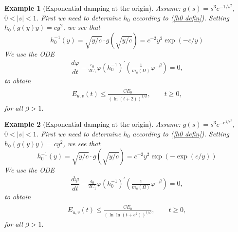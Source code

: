 \documentclass[11pt,reqno]{amsart}
\theoremstyle{plain}
\newtheorem{example}{Example}
\numberwithin{equation}{section}
\numberwithin{equation}{section}
\begin{document}
\begin{example}[Exponential damping at the origin]
\label{example:exp at origin}Assume: $g\left( s\right) =s^{3}e^{-1/s^{2}}$, $%
0<\left\vert s\right\vert <1$. First we need to determine $h_{0}$ according
to (\ref{h0 defin}). Setting $h_{0}(g(y)y)=cy^{2}$, we see that 
\begin{equation*}
h_{0}^{-1}(y)=\sqrt{y/c}\cdot g\left( \sqrt{y/c}\right) =c^{-2}y^{2}\exp
(-c/y)
\end{equation*}%
We use the ODE 
\begin{equation*}
\begin{array}{l}
\dfrac{d\varphi }{dt}-\frac{\epsilon _{0}}{2C_{1}}\varphi \left(
h_{0}^{-1}\right) ^{\prime }\left( \frac{1}{m_{a}\left( \Omega \right) }%
\varphi ^{-\beta }\right) =0,%
\end{array}%
\end{equation*}%
to obtain 
\begin{equation*}
\begin{array}{l}
E_{u,v}(t)\leq \frac{\tilde{C}E_{0}}{\left( \ln \left( t+2\right) \right)
^{1/\beta }},\qquad t\geq 0,%
\end{array}%
\end{equation*}%
for all $\beta >1.$
\end{example}

\begin{example}[Exponential damping at the origin]
\label{example:exp at origin copy(1)}Assume: $g\left( s\right)
=s^{3}e^{-e^{1/s^{2}}}$, $0<\left\vert s\right\vert <1$. First we need to
determine $h_{0}$ according to (\ref{h0 defin}). Setting $%
h_{0}(g(y)y)=cy^{2} $, we see that 
\begin{equation*}
h_{0}^{-1}(y)=\sqrt{y/c}\cdot g\left( \sqrt{y/c}\right) =c^{-2}y^{2}\exp
(-\exp \left( c/y\right) )
\end{equation*}%
We use the ODE 
\begin{equation*}
\begin{array}{l}
\dfrac{d\varphi }{dt}-\frac{\epsilon _{0}}{2C_{1}}\varphi \left(
h_{0}^{-1}\right) ^{\prime }\left( \frac{1}{m_{a}\left( \Omega \right) }%
\varphi ^{-\beta }\right) =0,%
\end{array}%
\end{equation*}%
to obtain 
\begin{equation*}
\begin{array}{l}
E_{u,v}(t)\leq \frac{\tilde{C}E_{0}}{\left( \ln \ln \left( t+e^{2}\right)
\right) ^{1/\beta }},\qquad t\geq 0,%
\end{array}%
\end{equation*}%
for all $\beta >1.$
\end{example}
\end{document}
